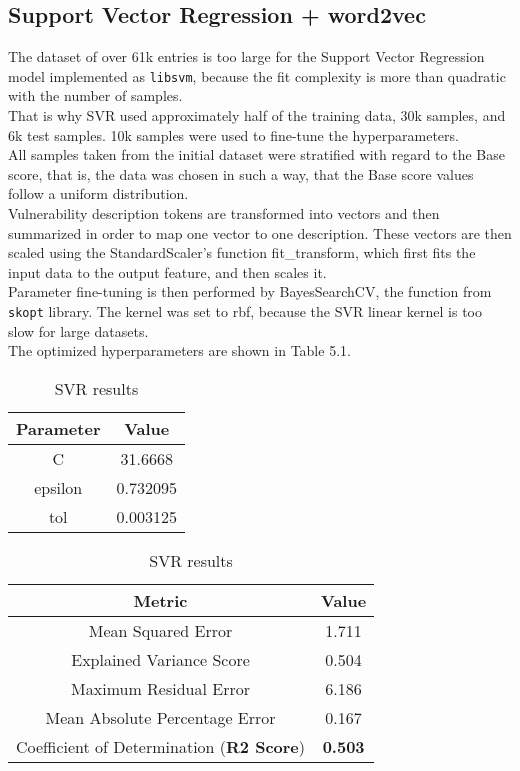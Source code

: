 \documentclass[times, utf8, zavrsni, english]{fer}
\begin{document}
\subsection{Support Vector Regression + word2vec}
The dataset of over 61k entries is too large for the Support Vector Regression model implemented as \texttt{libsvm}, because the fit complexity is more than quadratic with the number of samples.\\
That is why SVR used approximately half of the training data, 30k samples, and 6k test samples. 
10k samples were used to fine-tune the hyperparameters. \\
All samples taken from the initial dataset were stratified with regard to the Base score, that is, the data was chosen in such a way, that the Base score values follow a uniform distribution.\\
Vulnerability description tokens are transformed into vectors and then summarized in order to map one vector to one description.
These vectors are then scaled using the StandardScaler's function fit\_transform, which first fits the input data to the output feature, and then scales it.\\
Parameter fine-tuning is then performed by BayesSearchCV, the function from \texttt{skopt} library. The kernel was set to rbf, because the SVR linear kernel is too slow for large datasets.\\
The optimized hyperparameters are shown in Table 5.1.
\begin{table}[h!]
	\parbox{.45\linewidth}{
	\centering
	
	\begin{tabular}{|| c | c ||} 
		\hline
		Parameter & Value \\ [0.5ex] 
		\hline\hline
		C & 31.6668  \\ \hline
		epsilon & 0.732095 \\ \hline
		tol & 0.003125  \\ 
		\hline
	\end{tabular}
	\caption{Hyperparameteres for SVR}
	\label{table:3}
}
	\parbox{.45\linewidth}{
	\centering
	\begin{tabular}{|| c | c ||} 
		\hline
		Metric & Value \\ [0.5ex] 
		\hline\hline
		Mean Squared Error & 1.711  \\ \hline
		Explained Variance Score & 0.504\\ \hline
		Maximum Residual Error & 6.186 \\ \hline
		Mean Absolute Percentage Error & 0.167 \\ \hline
		Coefficient of Determination (\textbf{R2 Score}) & \textbf{0.503} \\
		\hline
	\end{tabular}
	\caption{SVR results}
	\label{table:4}
}
\end{table}
\end{document}
